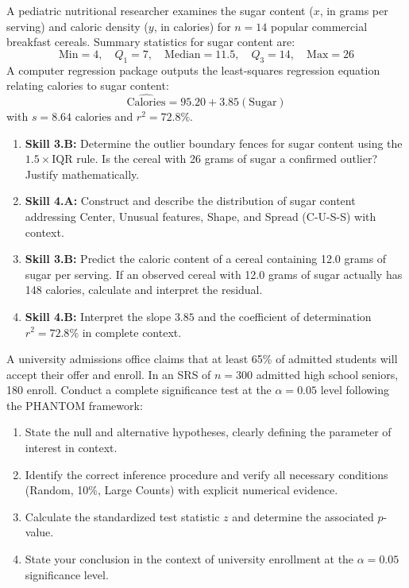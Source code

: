 \begin{workbookbox}
A pediatric nutritional researcher examines the sugar content ($x$, in grams per serving) and caloric density ($y$, in calories) for $n = 14$ popular commercial breakfast cereals. Summary statistics for sugar content are:
\[ \text{Min} = 4, \quad Q_1 = 7, \quad \text{Median} = 11.5, \quad Q_3 = 14, \quad \text{Max} = 26 \]
A computer regression package outputs the least-squares regression equation relating calories to sugar content:
\[ \widehat{\text{Calories}} = 95.20 + 3.85(\text{Sugar}) \]
with $s = 8.64\text{ calories}$ and $r^2 = 72.8\%$.
\begin{enumerate}[label=(\alph*)]
  \item \textbf{Skill 3.B:} Determine the outlier boundary fences for sugar content using the $1.5 \times \text{IQR}$ rule. Is the cereal with 26 grams of sugar a confirmed outlier? Justify mathematically.
  \item \textbf{Skill 4.A:} Construct and describe the distribution of sugar content addressing Center, Unusual features, Shape, and Spread (C-U-S-S) with context.
  \item \textbf{Skill 3.B:} Predict the caloric content of a cereal containing 12.0 grams of sugar per serving. If an observed cereal with 12.0 grams of sugar actually has 148 calories, calculate and interpret the residual.
  \item \textbf{Skill 4.B:} Interpret the slope $3.85$ and the coefficient of determination $r^2 = 72.8\%$ in complete context.
\end{enumerate}
\end{workbookbox}

\begin{workbookbox}
A university admissions office claims that at least 65\% of admitted students will accept their offer and enroll. In an SRS of $n = 300$ admitted high school seniors, 180 enroll.
Conduct a complete significance test at the $\alpha = 0.05$ level following the PHANTOM framework:
\begin{enumerate}[label=(\alph*)]
  \item State the null and alternative hypotheses, clearly defining the parameter of interest in context.
  \item Identify the correct inference procedure and verify all necessary conditions (Random, 10\%, Large Counts) with explicit numerical evidence.
  \item Calculate the standardized test statistic $z$ and determine the associated $p$-value.
  \item State your conclusion in the context of university enrollment at the $\alpha = 0.05$ significance level.
\end{enumerate}
\end{workbookbox}

